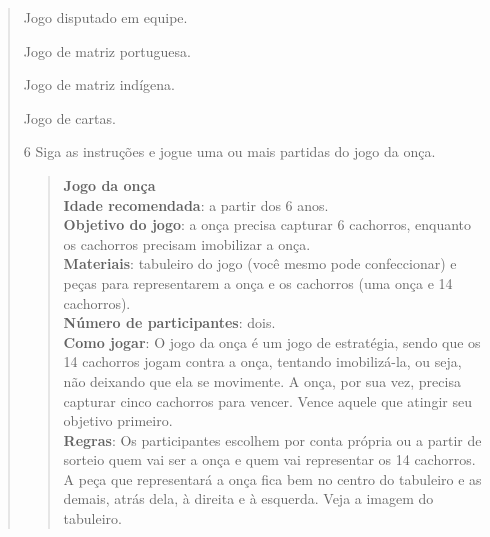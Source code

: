 \begin{escolha}
\begin{quote}
\begin{boxlist}
 Jogo disputado em equipe.

 Jogo de matriz portuguesa.

 Jogo de matriz indígena.

 Jogo de cartas.
\end{boxlist}


\num{6} Siga as instruções e jogue uma ou mais partidas do jogo da onça.

\begin{quote}
\textbf{Jogo da onça}\\
\textbf{Idade recomendada}: a partir dos 6 anos.\\
\textbf{Objetivo do jogo}: a onça precisa capturar 6 cachorros, enquanto
os cachorros precisam imobilizar a onça.\\
\textbf{Materiais}: tabuleiro do jogo (você mesmo pode confeccionar) e
peças para representarem a onça e os cachorros (uma onça e 14
cachorros).\\
\textbf{Número de participantes}: dois.\\
\textbf{Como jogar}: O jogo da onça é um jogo de estratégia, sendo que
os 14 cachorros jogam contra a onça, tentando imobilizá-la, ou seja, não
deixando que ela se movimente. A onça, por sua vez, precisa capturar
cinco cachorros para vencer. Vence aquele que atingir seu objetivo
primeiro.\\
\textbf{Regras}: Os participantes escolhem por conta própria ou a partir
de sorteio quem vai ser a onça e quem vai representar os 14 cachorros. A
peça que representará a onça fica bem no centro do tabuleiro e as
demais, atrás dela, à direita e à esquerda. Veja a imagem do tabuleiro.
\end{quote}



\end{quote}
\end{escolha}
